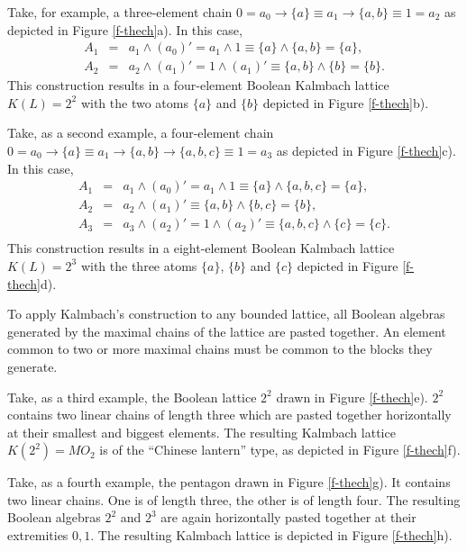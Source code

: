 \documentclass[%
  preprint,
 showpacs,
 showkeys,
 preprintnumbers,
 amsmath,amssymb,
 aps,
 rmp,
  longbibliography,
 ]{revtex4-1}
\begin{document}
Take, for example, a three-element chain
$0= a_0\rightarrow \{a\}\equiv a_1\rightarrow
\{a,b\}\equiv 1=a_2$
as depicted in Figure
\ref{f-thech}a).
In this case,
\begin{eqnarray*}
A_1&=&a_1\wedge (a_0)'=a_1\wedge 1\equiv \{a\}\wedge \{a,b\}=\{a\},\\
A_2&=&a_2\wedge (a_1)'=1\wedge (a_1)'\equiv \{a,b\}\wedge \{b\}=\{b\}.
\end{eqnarray*}
This construction results in a four-element Boolean Kalmbach lattice
$K(L)=2^2$ with the two atoms $\{a\}$ and $\{b\}$
depicted in Figure
\ref{f-thech}b).

Take, as a second example, a four-element chain
$0= a_0\rightarrow \{a\}\equiv a_1\rightarrow \{a,b\}
\rightarrow \{a,b,c\}\equiv 1=a_3$
as depicted in Figure
\ref{f-thech}c).
In this case,
\begin{eqnarray*}
A_1&=&a_1\wedge (a_0)'=a_1\wedge 1\equiv \{a\}\wedge \{a,b,c\}=\{a\},\\
A_2&=&a_2\wedge (a_1)'\equiv \{a,b\}\wedge \{b,c\}=\{b\},\\
A_3&=&a_3\wedge (a_2)'=1\wedge (a_2)'\equiv \{a,b,c\}\wedge \{c\}=\{c\}.\\
\end{eqnarray*}
This construction results in a eight-element Boolean Kalmbach lattice
$K(L)=2^3$ with the three atoms $\{a\}$, $\{b\}$ and $\{c\}$
depicted in Figure
\ref{f-thech}d).



To apply Kalmbach's
construction to any bounded lattice, all Boolean
algebras generated by the maximal chains of the lattice are pasted
together.
An element common to
two or more maximal chains must be common to the blocks they generate.

Take, as a third example, the Boolean lattice $2^2$ drawn in Figure
\ref{f-thech}e).
$2^2$ contains two
linear chains of length three which are pasted together horizontally at
their smallest and biggest elements.  The resulting
Kalmbach lattice $K(2^2)=MO_2$ is of the ``Chinese lantern'' type, as
depicted in Figure
\ref{f-thech}f).


Take, as a fourth example, the pentagon drawn in Figure
\ref{f-thech}g).
It contains two
linear chains. One is of length three, the other is of length four. The
resulting Boolean algebras $2^2$ and $2^3$ are again horizontally pasted
together at their extremities $0,1$.
The resulting
Kalmbach lattice is
depicted in Figure
\ref{f-thech}h).
\end{document}
